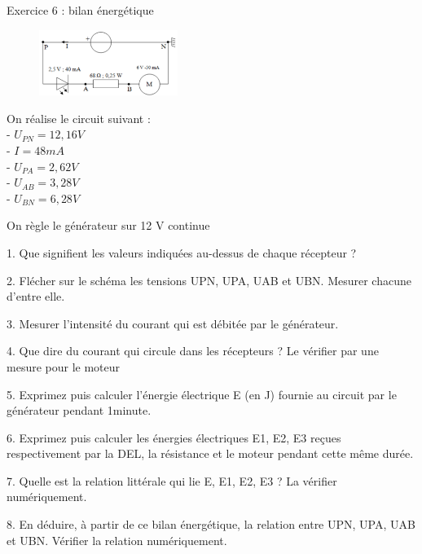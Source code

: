 \documentclass[12pt, french]{article}
\begin{document}
\begin{Box2}{Exercice 6 : bilan énergétique}
\begin{figure}
  \begin{center}
     \vspace{-0.5cm}
    \includegraphics[width=0.4\textwidth]{./img/diode_circuit.png}
  \end{center}
\end{figure}
On réalise le circuit suivant :
   \\- $U_{PN}=12,16 V$
\\- $I=48 mA$
   \\- $U_{PA}=2,62 V$
   \\- $U_{AB}=3,28 V$
   \\- $U_{BN}=6,28 V$

   On règle le générateur sur 12 V continue

   1. Que signifient les valeurs indiquées au-dessus de chaque récepteur ?

   2. Flécher sur le schéma les tensions UPN, UPA, UAB et UBN. Mesurer chacune d’entre elle.

   3. Mesurer l’intensité du courant qui est débitée par le générateur.

   4. Que dire du courant qui circule dans les récepteurs ? Le vérifier par une mesure pour le moteur

   5. Exprimez puis calculer l’énergie électrique E (en J) fournie au circuit par le générateur pendant
1minute.

   6. Exprimez puis calculer les énergies électriques E1, E2, E3 reçues respectivement par la DEL, la
résistance et le moteur pendant cette même durée.

   7. Quelle est la relation littérale qui lie E, E1, E2, E3 ? La vérifier numériquement.

   8. En déduire, à partir de ce bilan énergétique, la relation entre UPN, UPA, UAB et UBN. Vérifier la relation numériquement.
\end{Box2}
\end{document}

